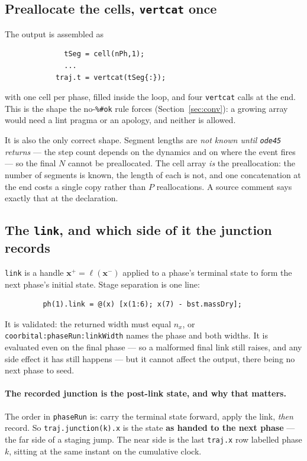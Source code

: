 \documentclass[11pt]{article}
\newcommand{\code}[1]{\texttt{#1}}
\begin{document}
\subsection{Preallocate the cells, \code{vertcat} once}

The output is assembled as

\begin{lstlisting}
              tSeg = cell(nPh,1);
              ...
            traj.t = vertcat(tSeg{:});
\end{lstlisting}

with one cell per phase, filled inside the loop, and four \code{vertcat} calls
at the end. This is the shape the no-\code{\%\#ok} rule forces
(Section~\ref{sec:conv}): a growing array would need a lint pragma or an
apology, and neither is allowed.

It is also the only correct shape. Segment lengths are \emph{not known until
\code{ode45} returns} --- the step count depends on the dynamics and on where
the event fires --- so the final $N$ cannot be preallocated. The cell array
\emph{is} the preallocation: the number of segments is known, the length of
each is not, and one concatenation at the end costs a single copy rather than
$P$ reallocations. A source comment says exactly that at the declaration.

\subsection{The \code{link}, and which side of it the junction records}

\code{link} is a handle $\mathbf{x}^{+} = \ell(\mathbf{x}^{-})$ applied to a
phase's terminal state to form the next phase's initial state. Stage separation
is one line:

\begin{lstlisting}
         ph(1).link = @(x) [x(1:6); x(7) - bst.massDry];
\end{lstlisting}

It is validated: the returned width must equal $n_x$, or
\code{coorbital:phaseRun:linkWidth} names the phase and both widths. It is
evaluated even on the final phase --- so a malformed final link still raises,
and any side effect it has still happens --- but it cannot affect the output,
there being no next phase to seed.

\paragraph{The recorded junction is the post-link state, and why that matters.}
The order in \code{phaseRun} is: carry the terminal state forward, apply the
link, \emph{then} record. So \code{traj.junction(k).x} is the state \textbf{as
handed to the next phase} --- the far side of a staging jump. The near side is
the last \code{traj.x} row labelled phase $k$, sitting at the same instant on
the cumulative clock.
\end{document}
